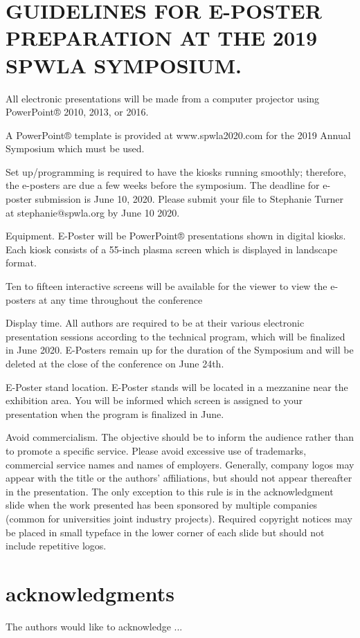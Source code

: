 \documentclass[10pt,twocolumn,twoside]{article}
\begin{document}
\section{GUIDELINES FOR E-POSTER PREPARATION AT THE 2019 SPWLA SYMPOSIUM.}
All electronic presentations will be made from a computer projector using PowerPoint® 2010, 2013, or 2016. 

A PowerPoint® template is provided at www.spwla2020.com for the 2019 Annual Symposium which must be used.

Set up/programming is required to have the kiosks running smoothly; therefore, the e-posters are due a few weeks before the symposium. The deadline for e-poster submission is June 10, 2020. Please submit your file to Stephanie Turner at stephanie@spwla.org by June 10 2020. 

Equipment.  E-Poster will be PowerPoint® presentations shown in digital kiosks. Each kiosk consists of a 55-inch plasma screen which is displayed in landscape format. 

Ten to fifteen interactive screens will be available for the viewer to view the e-posters at any time throughout the conference

Display time. All authors are required to be at their various electronic presentation sessions according to the technical program, which will be finalized in June 2020. E-Posters remain up for the duration of the Symposium and will be deleted at the close of the conference on June 24th. 

E-Poster stand location.  E-Poster stands will be located in a mezzanine near the exhibition area. You will be informed which screen is assigned to your presentation when the program is finalized in June.

Avoid commercialism.  The objective should be to inform the audience rather than to promote a specific service. Please avoid excessive use of trademarks, commercial service names and names of employers. Generally, company logos may appear with the title or the authors’ affiliations, but should not appear thereafter in the presentation. The only exception to this rule is in the acknowledgment slide when the work presented has been sponsored by multiple companies (common for universities joint industry projects). Required copyright notices may be placed in small typeface in the lower corner of each slide but should not include repetitive logos.


\section{acknowledgments}
The authors would like to acknowledge ...
\end{document}
